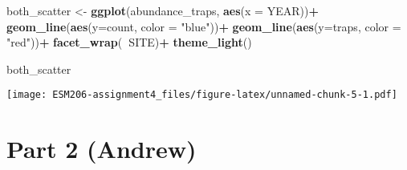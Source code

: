 \documentclass[]{article}
\newenvironment{Shaded}{\begin{snugshade}}{\end{snugshade}}
\newcommand{\KeywordTok}[1]{\textcolor[rgb]{0.13,0.29,0.53}{\textbf{#1}}}
\newcommand{\DataTypeTok}[1]{\textcolor[rgb]{0.13,0.29,0.53}{#1}}
\newcommand{\DecValTok}[1]{\textcolor[rgb]{0.00,0.00,0.81}{#1}}
\newcommand{\StringTok}[1]{\textcolor[rgb]{0.31,0.60,0.02}{#1}}
\newcommand{\CommentTok}[1]{\textcolor[rgb]{0.56,0.35,0.01}{\textit{#1}}}
\newcommand{\OperatorTok}[1]{\textcolor[rgb]{0.81,0.36,0.00}{\textbf{#1}}}
\newcommand{\NormalTok}[1]{#1}
\begin{document}
\begin{Shaded}
\begin{Highlighting}[]
\NormalTok{both_scatter <-}\StringTok{ }\KeywordTok{ggplot}\NormalTok{(abundance_traps, }\KeywordTok{aes}\NormalTok{(}\DataTypeTok{x =}\NormalTok{ YEAR))}\OperatorTok{+}
\StringTok{  }\KeywordTok{geom_line}\NormalTok{(}\KeywordTok{aes}\NormalTok{(}\DataTypeTok{y=}\NormalTok{count, }\DataTypeTok{color =} \StringTok{"blue"}\NormalTok{))}\OperatorTok{+}
\StringTok{  }\KeywordTok{geom_line}\NormalTok{(}\KeywordTok{aes}\NormalTok{(}\DataTypeTok{y=}\NormalTok{traps, }\DataTypeTok{color =} \StringTok{"red"}\NormalTok{))}\OperatorTok{+}
\StringTok{  }\KeywordTok{facet_wrap}\NormalTok{(}\OperatorTok{~}\NormalTok{SITE)}\OperatorTok{+}
\StringTok{  }\KeywordTok{theme_light}\NormalTok{()}

\NormalTok{both_scatter}
\end{Highlighting}
\end{Shaded}

\texttt{[image: ESM206-assignment4\_files/figure-latex/unnamed-chunk-5-1.pdf]}

\section{Part 2 (Andrew)}\label{part-2-andrew}

\begin{Shaded}
\end{Shaded}
\end{document}
